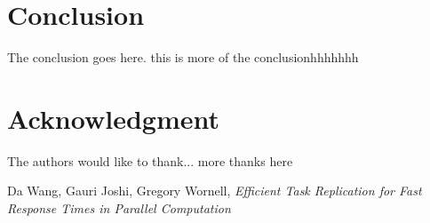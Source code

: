 \documentclass[10pt, conference, compsocconf]{IEEEtran}
\begin{document}
\section{Conclusion}
The conclusion goes here. this is more of the conclusionhhhhhhh



\section*{Acknowledgment}


The authors would like to thank...
more thanks here




%
%
%
   \begin{thebibliography}{1}


Da Wang, Gauri Joshi, Gregory Wornell, \emph{ Efficient Task Replication for Fast Response Times in Parallel Computation}

\end{thebibliography}

\end{document}

